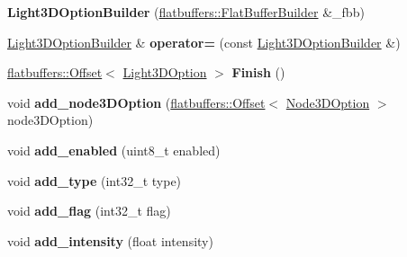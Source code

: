 \begin{DoxyCompactItemize}
{\bfseries Light3\+D\+Option\+Builder} (\hyperlink{classflatbuffers_1_1FlatBufferBuilder}{flatbuffers\+::\+Flat\+Buffer\+Builder} \&\+\_\+fbb)
\item 
\mbox{\label{structflatbuffers_1_1Light3DOptionBuilder_af9cba35fba7f78b37ae54ee345bcb045}} 
\hyperlink{structflatbuffers_1_1Light3DOptionBuilder}{Light3\+D\+Option\+Builder} \& {\bfseries operator=} (const \hyperlink{structflatbuffers_1_1Light3DOptionBuilder}{Light3\+D\+Option\+Builder} \&)
\item 
\mbox{\label{structflatbuffers_1_1Light3DOptionBuilder_a0d19356292ea4f13101a45f25a05f676}} 
\hyperlink{structflatbuffers_1_1Offset}{flatbuffers\+::\+Offset}$<$ \hyperlink{structflatbuffers_1_1Light3DOption}{Light3\+D\+Option} $>$ {\bfseries Finish} ()
\item 
\mbox{\label{structflatbuffers_1_1Light3DOptionBuilder_ad6bf082190e8676298a068df266a5339}} 
void {\bfseries add\+\_\+node3\+D\+Option} (\hyperlink{structflatbuffers_1_1Offset}{flatbuffers\+::\+Offset}$<$ \hyperlink{structflatbuffers_1_1Node3DOption}{Node3\+D\+Option} $>$ node3\+D\+Option)
\item 
\mbox{\label{structflatbuffers_1_1Light3DOptionBuilder_a0ddf5efff2d3961ccdbbe5df37ed0795}} 
void {\bfseries add\+\_\+enabled} (uint8\+\_\+t enabled)
\item 
\mbox{\label{structflatbuffers_1_1Light3DOptionBuilder_a990bfcac08e82da3b0971341d52df8c4}} 
void {\bfseries add\+\_\+type} (int32\+\_\+t type)
\item 
\mbox{\label{structflatbuffers_1_1Light3DOptionBuilder_afce23dc70a01ca39497c73625655d065}} 
void {\bfseries add\+\_\+flag} (int32\+\_\+t flag)
\item 
\mbox{\label{structflatbuffers_1_1Light3DOptionBuilder_af5b3308db80f031cce7846b6c601ce39}} 
void {\bfseries add\+\_\+intensity} (float intensity)
\item 
\mbox{\label{structflatbuffers_1_1Light3DOptionBuilder_a255527f0b7b1e52cbd334824b628f46f}} 

\end{DoxyCompactItemize}
